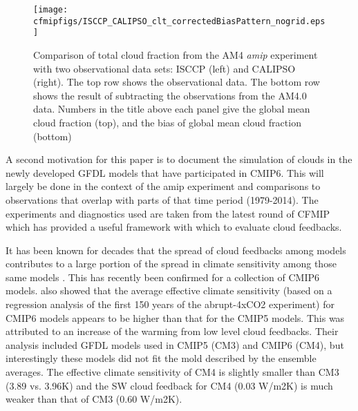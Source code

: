 \documentclass[draft]{agujournal2019}
\begin{document}
\begin{figure}
  \centering
  \texttt{[image: cfmipfigs/ISCCP\_CALIPSO\_clt\_correctedBiasPattern\_nogrid.eps]}
  \caption{Comparison of total cloud fraction from the AM4 \textit{amip} experiment with two observational 
  data sets: ISCCP (left) and CALIPSO (right).  The top row shows the observational data.  The bottom row
  shows the result of subtracting the observations from the AM4.0 data.  Numbers in the title above each 
  panel give the global mean cloud fraction (top), and the bias of global mean cloud fraction (bottom)}
  \label{fig:clt_isccp_calipso}
\end{figure}

A second motivation for this paper is to document the simulation of clouds in the newly developed GFDL models that 
have participated in CMIP6.  This will largely be done in the context of the amip experiment and comparisons to observations
that overlap with parts of that time period (1979-2014).  The experiments and diagnostics used are taken from the latest 
round of CFMIP which has provided a useful framework with which to evaluate cloud feedbacks.       

It has been known for decades that  the spread of cloud feedbacks among models contributes to a large portion of the 
spread in climate sensitivity among those same models \cite{Cess_etal_1989, Bony_Dufresne_2005}.  
This has recently been confirmed \cite{Zelinka_etal_2020} for a collection of CMIP6 models.   also showed that 
the average effective climate sensitivity (based on a regression analysis of the first 150 years of the abrupt-4xCO2 
experiment) for CMIP6 models appears to be higher than that for the CMIP5 models.  This was attributed to an 
increase of the warming from low level cloud feedbacks.  Their analysis included GFDL models used in CMIP5 (CM3) 
and CMIP6 (CM4), but interestingly
these models did not fit the mold described by the ensemble averages.  The effective climate sensitivity of 
CM4 is slightly smaller than CM3 (3.89 vs. 3.96K) and the SW cloud feedback for CM4 (0.03 W/m2K) is much
weaker than that of CM3 (0.60 W/m2K).  
\end{document}
